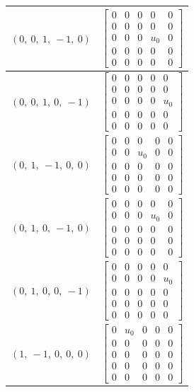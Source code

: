 \documentclass[11pt]{article}
\theoremstyle{definition}
\begin{document}
\begin{longtable}{|l|c|}
    \hline
    $\left( 0, \  0, \  1, \  -1, \  0\right)$ & ${\left[\begin{matrix}0 & 0 & 0 & 0 & 0\\0 & 0 & 0 & 0 & 0\\0 & 0 & 0 & u_{0} & 0\\0 & 0 & 0 & 0 & 0\\0 & 0 & 0 & 0 & 0\end{matrix}\right]}$ \\
    \hline
    $\left( 0, \  0, \  1, \  0, \  -1\right)$ & ${\left[\begin{matrix}0 & 0 & 0 & 0 & 0\\0 & 0 & 0 & 0 & 0\\0 & 0 & 0 & 0 & u_{0}\\0 & 0 & 0 & 0 & 0\\0 & 0 & 0 & 0 & 0\end{matrix}\right]}$ \\
    \hline
    $\left( 0, \  1, \  -1, \  0, \  0\right)$ & ${\left[\begin{matrix}0 & 0 & 0 & 0 & 0\\0 & 0 & u_{0} & 0 & 0\\0 & 0 & 0 & 0 & 0\\0 & 0 & 0 & 0 & 0\\0 & 0 & 0 & 0 & 0\end{matrix}\right]}$ \\
    \hline
    $\left( 0, \  1, \  0, \  -1, \  0\right)$ & ${\left[\begin{matrix}0 & 0 & 0 & 0 & 0\\0 & 0 & 0 & u_{0} & 0\\0 & 0 & 0 & 0 & 0\\0 & 0 & 0 & 0 & 0\\0 & 0 & 0 & 0 & 0\end{matrix}\right]}$ \\
    \hline
    $\left( 0, \  1, \  0, \  0, \  -1\right)$ & ${\left[\begin{matrix}0 & 0 & 0 & 0 & 0\\0 & 0 & 0 & 0 & u_{0}\\0 & 0 & 0 & 0 & 0\\0 & 0 & 0 & 0 & 0\\0 & 0 & 0 & 0 & 0\end{matrix}\right]}$ \\
    \hline
    $\left( 1, \  -1, \  0, \  0, \  0\right)$ & ${\left[\begin{matrix}0 & u_{0} & 0 & 0 & 0\\0 & 0 & 0 & 0 & 0\\0 & 0 & 0 & 0 & 0\\0 & 0 & 0 & 0 & 0\\0 & 0 & 0 & 0 & 0\end{matrix}\right]}$ \\

\end{longtable}
\end{document}
